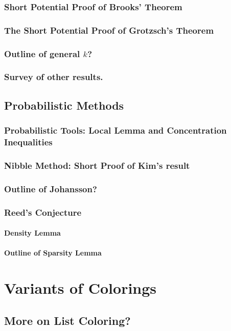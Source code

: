\documentclass[12pt,twoside,openright,a4paper]{book}
\begin{document}
\section{Short Potential Proof of Brooks' Theorem}
\section{The Short Potential Proof of Grotzsch's Theorem}
\section{Outline of general $k$?}
\section{Survey of other results.}

\chapter{Probabilistic Methods}
\section{Probabilistic Tools: Local Lemma and Concentration Inequalities}
\section{Nibble Method: Short Proof of Kim's result}
\section{Outline of Johansson?}
\section{Reed's Conjecture}
\subsection{Density Lemma}
\subsection{Outline of Sparsity Lemma}

\part{Variants of Colorings}

\chapter{More on List Coloring?}
\end{document}
